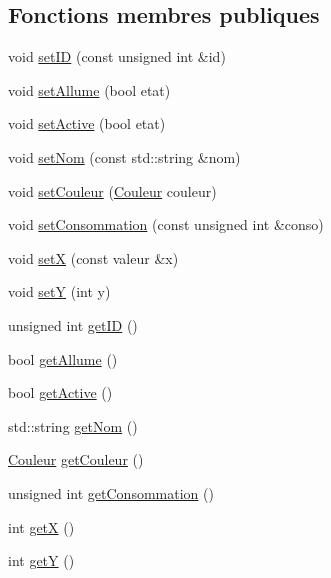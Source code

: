 \subsection*{Fonctions membres publiques}
\begin{DoxyCompactItemize}
\item 
void \hyperlink{classEclairage_1_1Ent_a927ff132e908bb3e68dab254f6c2ac2d}{set\+ID} (const unsigned int \&id)
\item 
void \hyperlink{classEclairage_1_1Ent_a3c9d21bd3c725857050e39eb449d1ad5}{set\+Allume} (bool etat)
\item 
void \hyperlink{classEclairage_1_1Ent_a1e9471a412f746a2284778c8d9548499}{set\+Active} (bool etat)
\item 
void \hyperlink{classEclairage_1_1Ent_a348836d7b3c2f69f376d63c84ace8e3e}{set\+Nom} (const std\+::string \&nom)
\item 
void \hyperlink{classEclairage_1_1Ent_a5f1a309d7e9c51a921a9ffcf8f6343f7}{set\+Couleur} (\hyperlink{Couleur_8h_aa304d0ca681f782b1d7735da33037dd7}{Couleur} couleur)
\item 
void \hyperlink{classEclairage_1_1Ent_a64c03bcbe84186341b0d9f23e91cdfd8}{set\+Consommation} (const unsigned int \&conso)
\item 
void \hyperlink{classEclairage_1_1Ent_a4803c876b2dc4ca8b85542261aae7bb1}{setX} (const valeur \&x)
\item 
void \hyperlink{classEclairage_1_1Ent_abdf5e31d5b5788c832b964c3712b7231}{setY} (int y)
\item 
unsigned int \hyperlink{classEclairage_1_1Ent_a503507f6dc76a84b54e22ef21d9f301d}{get\+ID} ()
\item 
bool \hyperlink{classEclairage_1_1Ent_a6d968244e96edee75019717f95dbb1d2}{get\+Allume} ()
\item 
bool \hyperlink{classEclairage_1_1Ent_a7fdf3efdeb7ec2f649a79a1681db6e1e}{get\+Active} ()
\item 
std\+::string \hyperlink{classEclairage_1_1Ent_ae440f0f45ec8f6d11e54c1a0ebe8d5c1}{get\+Nom} ()
\item 
\hyperlink{Couleur_8h_aa304d0ca681f782b1d7735da33037dd7}{Couleur} \hyperlink{classEclairage_1_1Ent_aaedbcf1b433035acb8470b0c4c50f826}{get\+Couleur} ()
\item 
unsigned int \hyperlink{classEclairage_1_1Ent_afb847965b5bcccc415bb169e500656f9}{get\+Consommation} ()
\item 
int \hyperlink{classEclairage_1_1Ent_a0b54632cd5ff1bcb588c4f8527361990}{getX} ()
\item 
int \hyperlink{classEclairage_1_1Ent_a12a54fa5d966278eefc4b035142ade70}{getY} ()
\end{DoxyCompactItemize}


